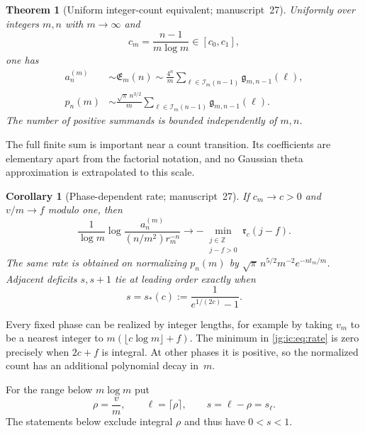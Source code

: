 \documentclass[11pt,a4paper]{article}
\newtheorem{theorem}{Theorem}[section]
\newtheorem{corollary}[corollary]{Corollary}
\theoremstyle{definition}\newaliascnt{definition}{theorem}
\theoremstyle{remark}\newaliascnt{remark}{theorem}
\begin{document}
\begin{theorem}[Uniform integer-count equivalent; manuscript~27]
\label{jg:ic:thm:main}
Uniformly over integers $m,n$ with $m\to\infty$ and
\begin{equation}\label{jg:ic:eq:range}
 c_m=\frac{n-1}{m\log m}\in[c_0,c_1],
\end{equation}
one has
\begin{align}
 a_n^{(m)}&\sim\mathfrak E_m(n)
 \sim\frac{4^n}{m}\sum_{\ell\in\mathcal I_m(n-1)}\mathfrak g_{m,n-1}(\ell),
                                                        \label{jg:ic:eq:count}\\
 p_n(m)&\sim\frac{\sqrt\pi\,n^{3/2}}{m}
                \sum_{\ell\in\mathcal I_m(n-1)}\mathfrak g_{m,n-1}(\ell).
                                                        \label{jg:ic:eq:prob}
\end{align}
The number of positive summands is bounded independently of $m,n$.
\end{theorem}

The full finite sum is important near a count transition. Its coefficients are
elementary apart from the factorial notation, and no Gaussian theta
approximation is extrapolated to this scale.

\begin{corollary}[Phase-dependent rate; manuscript~27]\label{jg:ic:cor:rate}
If $c_m\to c>0$ and $v/m\to f$ modulo one, then
\begin{equation}\label{jg:ic:eq:rate}
 \frac1{\log m}\log\frac{a_n^{(m)}}{(n/m^2)r_m^{-n}}
 \longrightarrow-\min_{\substack{j\in\mathbb Z\\j-f>0}}\mathfrak r_c(j-f).
\end{equation}
The same rate is obtained on normalizing $p_n(m)$ by
$\sqrt\pi\,n^{5/2}m^{-2}e^{-nt_m/m}$. Adjacent deficits $s,s+1$ tie at leading
order exactly when
\begin{equation}\label{jg:ic:eq:threshold}
 s=s_*(c):=\frac1{e^{1/(2c)}-1}.
\end{equation}
\end{corollary}

Every fixed phase can be realized by integer lengths, for example by taking
$v_m$ to be a nearest integer to $m(\lfloor c\log m\rfloor+f)$. The minimum in
\eqref{jg:ic:eq:rate} is zero precisely when $2c+f$ is integral. At other phases
it is positive, so the normalized count has an additional polynomial decay
in~$m$.

For the range below $m\log m$ put
\begin{equation}\label{jg:gm:eq:basic}
 \rho=\frac vm,\qquad \ell=\lceil\rho\rceil,\qquad
 s=\ell-\rho=s_\ell .
\end{equation}
The statements below exclude integral $\rho$ and thus have $0<s<1$.
\end{document}
